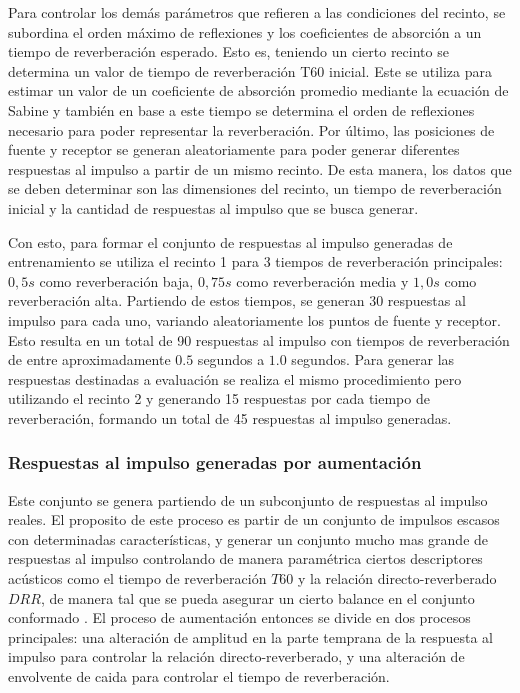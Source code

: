 Para controlar los demás parámetros que refieren a las condiciones del recinto, se subordina el orden máximo de reflexiones y los coeficientes de absorción a un tiempo de reverberación esperado. Esto es, teniendo un cierto recinto se determina un valor de tiempo de reverberación T60 inicial. Este se utiliza para estimar un valor de un coeficiente de absorción promedio mediante la ecuación de Sabine y también en base a este tiempo se determina el orden de reflexiones necesario para poder representar la reverberación. 
Por último, las posiciones de fuente y receptor se generan aleatoriamente para poder generar diferentes respuestas al impulso a partir de un mismo recinto. De esta manera, los datos que se deben determinar son las dimensiones del recinto, un tiempo de reverberación inicial y la cantidad de respuestas al impulso que se busca generar. 

Con esto, para formar el conjunto de respuestas al impulso generadas de entrenamiento se utiliza el recinto 1 para 3 tiempos de reverberación principales: $0,5 s$ como reverberación baja, $0,75 s$ como reverberación media y $1,0 s$ como reverberación alta. Partiendo de estos tiempos, se generan 30 respuestas al impulso para cada uno, variando aleatoriamente los puntos de fuente y receptor. Esto resulta en un total de 90 respuestas al impulso con tiempos de reverberación de entre aproximadamente $0.5$ segundos a $1.0$ segundos. Para generar las respuestas destinadas a evaluación se realiza el mismo procedimiento pero utilizando el recinto 2 y generando 15 respuestas por cada tiempo de reverberación, formando un total de 45 respuestas al impulso generadas. 

\subsubsection{Respuestas al impulso generadas por aumentación}
Este conjunto se genera partiendo de un subconjunto de respuestas al impulso reales. El proposito de este proceso es partir de un conjunto de impulsos escasos con determinadas características, y generar un conjunto mucho mas grande de respuestas al impulso controlando de manera paramétrica ciertos descriptores acústicos como el tiempo de reverberación $T60$ y la relación directo-reverberado $DRR$, de manera tal que se pueda asegurar un cierto balance en el conjunto conformado \cite{rir_aug}. El proceso de aumentación entonces se divide en dos procesos principales: una alteración de amplitud en la parte temprana de la respuesta al impulso para controlar la relación directo-reverberado, y una alteración de envolvente de caida para controlar el tiempo de reverberación.


